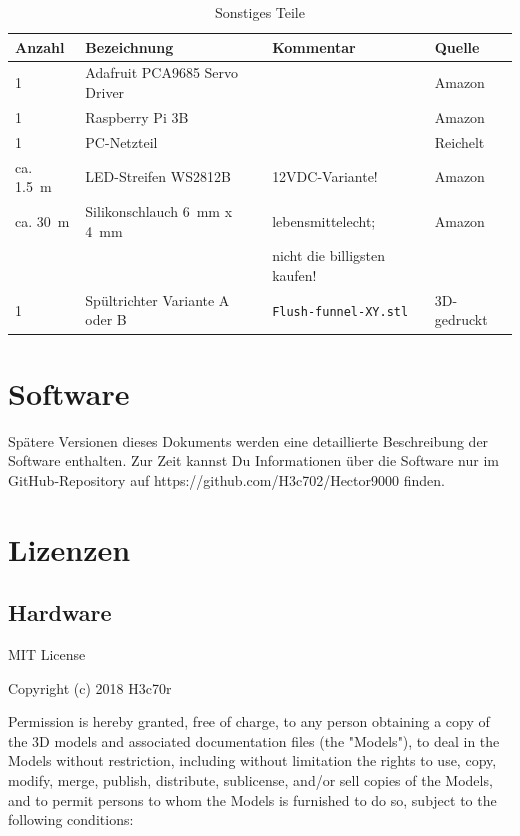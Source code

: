\documentclass[a4paper]{scrartcl}
\begin{document}
\begin{table}
\caption{Sonstiges Teile}
\begin{tabular}{|l|l|l|l|}
\hline
Anzahl & Bezeichnung & Kommentar & Quelle\\
\hline 
1 & Adafruit PCA9685 Servo Driver & & Amazon \\
\hline 
1 & Raspberry Pi 3B & & Amazon\\
\hline  
1 & PC-Netzteil & & Reichelt\\
\hline
ca. \SI{1.5}{\metre} & LED-Streifen WS2812B & 12VDC-Variante! & Amazon\\
\hline
ca. \SI{30}{\metre} & Silikonschlauch \SI{6}{\milli\metre} x \SI{4}{\milli\metre} & lebensmittelecht;            & Amazon\\
                    &                                                             & nicht die billigsten kaufen! &  \\
\hline 
1 & Spültrichter Variante A oder B & \texttt{Flush-funnel-XY.stl} & 3D-gedruckt\\
\hline 
\end{tabular}
\end{table}

\FloatBarrier
\section{Software}
Spätere Versionen dieses Dokuments werden eine detaillierte Beschreibung der Software enthalten. Zur Zeit kannst Du Informationen über die Software nur im GitHub-Repository auf https://github.com/H3c702/Hector9000 finden.

\section{Lizenzen}
\subsection{Hardware}
MIT License

\noindent
Copyright (c) 2018 H3c70r

\noindent
Permission is hereby granted, free of charge, to any person obtaining a copy
of the 3D models and associated documentation files (the "{}Models"{}), to deal
in the Models without restriction, including without limitation the rights
to use, copy, modify, merge, publish, distribute, sublicense, and/or sell
copies of the Models, and to permit persons to whom the Models is
furnished to do so, subject to the following conditions:
\end{document}
